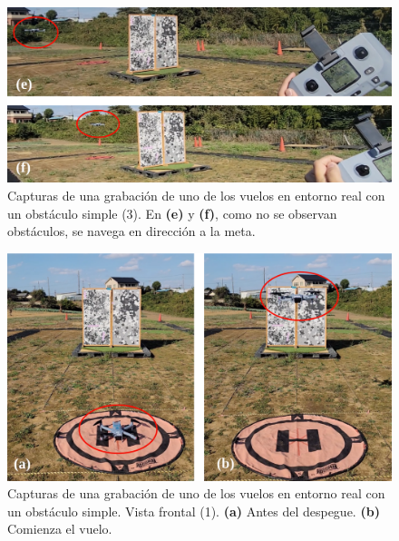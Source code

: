 \begin{figure}[H]
    \centering
    \includegraphics[scale=0.245]{partes/img/real-1-single-3-frames-3.png}
    \caption[Capturas de una grabación de uno de los vuelos en entorno real con un obstáculo simple (3).]{Capturas de una grabación de uno de los vuelos en entorno real con un obstáculo simple (3). En \textbf{(e)} y \textbf{(f)}, como no se observan obstáculos, se navega en dirección a la meta.}
    \label{real-1-single-3-frames-3}
\end{figure}

\begin{figure}[H]
    \centering
    \includegraphics[scale=0.24]{partes/img/real-1-single-4-frames-1.png}
    \caption[Capturas de una grabación de uno de los vuelos en entorno real con un obstáculo simple. Vista frontal (1).]{Capturas de una grabación de uno de los vuelos en entorno real con un obstáculo simple. Vista frontal (1). \textbf{(a)} Antes del despegue. \textbf{(b)} Comienza el vuelo.}
    \label{real-1-single-4-frames-1}
\end{figure}

